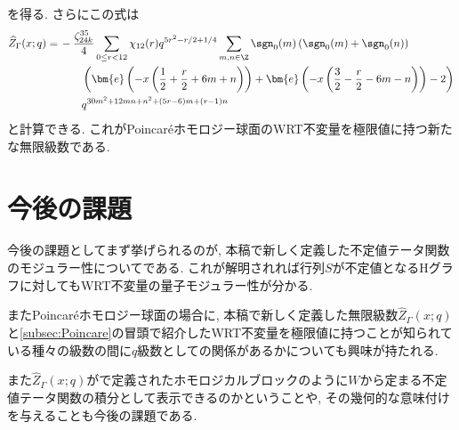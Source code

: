 \documentclass[11pt,b5paper,oneside,lualatex]{ltjsarticle} %
\numberwithin{equation}{section} %
\begin{document}
を得る. 
さらにこの式は
\begin{align}
	\widehat{Z}_{\Gamma} (x; q)
	= \,
	&-\frac{\zeta_{24k}^{35}}{4} 
	\sum_{0 \le r < 12} \chi_{12} (r) q^{5r^2 - r/2 + 1/4}
	\sum_{m, n \in \Z} \sgn_0(m) \left( \sgn_0(m) + \sgn_0(n) \right) 
	\\
	&\qquad 
	\left(
	\bm{e} \left( -x \left( \frac{1}{2} + \frac{r}{2} + 6m + n \right) \right)
	+
	\bm{e} \left( -x \left( \frac{3}{2} - \frac{r}{2} - 6m - n \right) \right)
	- 2
	\right)
	\\
	&\qquad 
	q^{30m^2 + 12mn + n^2 + (5r - 6)m + (r-1)n}
\end{align}
と計算できる. 
これがPoincar\'{e}ホモロジー球面のWRT不変量を極限値に持つ新たな無限級数である. 


\section{今後の課題} \label{sec:future}


今後の課題としてまず挙げられるのが, 本稿で新しく定義した不定値テータ関数のモジュラー性についてである. 
これが解明されれば行列$ S $が不定値となるHグラフに対してもWRT不変量の量子モジュラー性が分かる. 

またPoincar\'{e}ホモロジー球面の場合に, 本稿で新しく定義した無限級数$ \widehat{Z}_{\Gamma} (x; q) $と\cref{subsec:Poincare}の冒頭で紹介したWRT不変量を極限値に持つことが知られている種々の級数の間に$ q $級数としての関係があるかについても興味が持たれる. 

また$ \widehat{Z}_{\Gamma} (x; q) $が\cite{GPPV}で定義されたホモロジカルブロックのように$ W $から定まる不定値テータ関数の積分として表示できるのかということや, その幾何的な意味付けを与えることも今後の課題である. 






\end{document}
